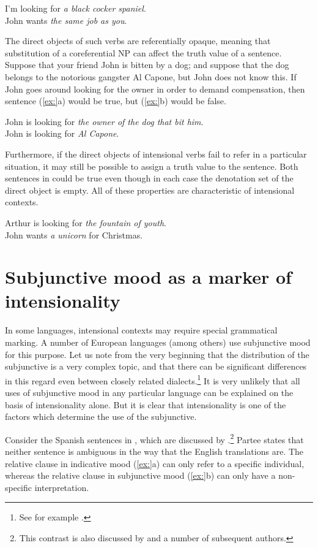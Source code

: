 \ea
\ea I’m looking for \textit{a black cocker spaniel}.\\
\ex John wants \textit{the same job as you}.
                       \z
\z


The direct objects of such verbs are referentially opaque, meaning that substitution of a coreferential NP can affect the truth value of a sentence. Suppose that your friend John is bitten by a dog; and suppose that the dog belongs to the notorious gangster Al Capone, but John does not know this. If John goes around looking for the owner in order to demand compensation, then sentence (\ref{ex:}a) would be true, but (\ref{ex:}b) would be false.


\ea
\ea John is looking for \textit{the owner of the dog that bit him}.\\
\ex John is looking for \textit{Al Capone}.
                       \z
\z


Furthermore, if the direct objects of intensional verbs fail to refer in a particular situation, it may still be possible to assign a truth value to the sentence. Both sentences in  could be true even though in each case the denotation set of the direct object is empty. All of these properties are characteristic of intensional contexts.


\ea
\ea Arthur is looking for \textit{the fountain of youth}.\\
\ex John wants \textit{a unicorn} for Christmas.
                       \z
\z

\section{Subjunctive mood as a marker of intensionality}\label{sec:15.5}

In some languages, intensional contexts may require special grammatical marking. A number of European languages (among others) use subjunctive mood for this purpose. Let us note from the very beginning that the distribution of the subjunctive is a very complex topic, and that there can be significant differences in this regard even between closely related dialects.\footnote{See for example \citet{Marques2004}.} It is very unlikely that all uses of subjunctive mood in any particular language can be explained on the basis of intensionality alone. But it is clear that intensionality is one of the factors which determine the use of the subjunctive.



Consider the Spanish sentences in , which are discussed by \citet{Partee2008}.\footnote{This contrast is also discussed by \citet{Quine1956} and a number of subsequent authors.} Partee states that neither sentence is ambiguous in the way that the English translations are. The relative clause in indicative mood (\ref{ex:}a) can only refer to a specific individual, whereas the relative clause in subjunctive mood (\ref{ex:}b) can only have a non-specific interpretation.


